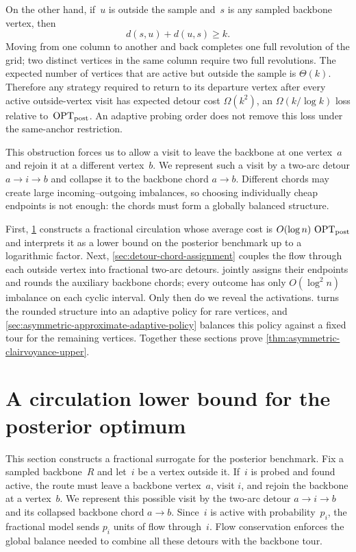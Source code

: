 \documentclass[12pt,a4paper,oneside]{report}
\begin{document}
On the other hand, if~$u$ is outside the sample and~$s$ is any sampled
backbone vertex, then
\[
    d(s,u)+d(u,s)\ge k.
\]
Moving from one column to another and back completes one full revolution of
the grid; two distinct vertices in the same column require two full
revolutions.  The expected number of vertices that are active but outside
the sample is
$\Theta(k)$.  Therefore any strategy required to return to its departure
vertex after every active outside-vertex visit has expected detour cost
$\Omega(k^2)$, an $\Omega(k/\log k)$ loss relative to~$\operatorname{OPT}_\mathrm{post}$.  An adaptive
probing order does not remove this loss under the same-anchor restriction.

This obstruction forces us to allow a visit to leave the backbone at one
vertex~$a$ and rejoin it at a different vertex~$b$.  We represent such a
visit by a two-arc detour $a\to i\to b$ and collapse it to the backbone chord
$a\to b$.  Different chords may create large incoming--outgoing imbalances,
so choosing individually cheap endpoints is not enough: the chords must form
a globally balanced structure.

First, \cref{sec:low-cost-circulation} constructs a fractional circulation
whose average cost is $O(\log n)\,\operatorname{OPT}_\mathrm{post}$ and interprets it as a lower bound
on the posterior benchmark up to a logarithmic factor.  Next,
\cref{sec:detour-chord-assignment} couples the flow through each outside
vertex into fractional two-arc detours.
 jointly assigns their endpoints and
rounds the auxiliary backbone chords; every outcome has only
$O(\log^2 n)$ imbalance on each cyclic interval.  Only then do we reveal the
activations.   turns the rounded
structure into an adaptive policy for rare vertices, and
\cref{sec:asymmetric-approximate-adaptive-policy} balances this policy against
a fixed tour for the remaining vertices.  Together these sections prove
\cref{thm:asymmetric-clairvoyance-upper}.

\section{A circulation lower bound for the posterior optimum}
\label{sec:low-cost-circulation}

This section constructs a fractional surrogate for the posterior benchmark.
Fix a sampled backbone~$R$ and let~$i$ be a vertex outside it.  If~$i$ is
probed and found active, the route must leave a backbone vertex~$a$, visit
$i$, and rejoin the backbone at a vertex~$b$.  We represent this possible
visit by the two-arc detour $a\to i\to b$ and its collapsed backbone chord
$a\to b$.  Since~$i$ is active with probability~$p_i$, the fractional model
sends $p_i$ units of flow through~$i$.  Flow conservation enforces the global
balance needed to combine all these detours with the backbone tour.
\end{document}
